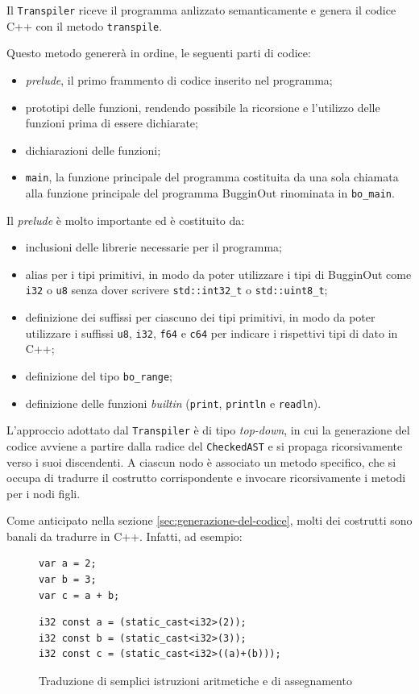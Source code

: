 Il \texttt{Transpiler} riceve il programma anlizzato semanticamente e genera il codice C++ con il metodo \texttt{transpile}.

Questo metodo generer\`a in ordine, le seguenti parti di codice:
\begin{itemize}
	\item \emph{prelude}, il primo frammento di codice inserito nel programma;
	\item prototipi delle funzioni, rendendo possibile la ricorsione e l'utilizzo delle funzioni prima di essere dichiarate;
	\item dichiarazioni delle funzioni;
	\item \texttt{main}, la funzione principale del programma costituita da una sola chiamata alla funzione principale del programma BugginOut rinominata in \texttt{bo\_main}.
\end{itemize}

Il \textit{prelude} \`e molto importante ed \`e costituito da:
\begin{itemize}
	\item inclusioni delle librerie necessarie per il programma;
	\item alias per i tipi primitivi, in modo da poter utilizzare i tipi di BugginOut come \texttt{i32} o \texttt{u8} senza dover scrivere \texttt{std::int32\_t} o \texttt{std::uint8\_t};
	\item definizione dei suffissi per ciascuno dei tipi primitivi, in modo da poter utilizzare i suffissi \texttt{u8}, \texttt{i32}, \texttt{f64} e \texttt{c64} per indicare i rispettivi tipi di dato in C++;
	\item definizione del tipo \texttt{bo\_range};
	\item definizione delle funzioni \textit{builtin} (\texttt{print}, \texttt{println} e \texttt{readln}).
\end{itemize}

L'approccio adottato dal \texttt{Transpiler} è di tipo \textit{top-down}, in cui la generazione del codice avviene a partire dalla radice del \texttt{CheckedAST} e si propaga ricorsivamente verso i suoi discendenti. A ciascun nodo è associato un metodo specifico, che si occupa di tradurre il costrutto corrispondente e invocare ricorsivamente i metodi per i nodi figli.

Come anticipato nella sezione \ref{sec:generazione-del-codice}, molti dei costrutti sono banali da tradurre in C++. Infatti, ad esempio:

\begin{figure}[H]
	\centering
	\begin{verbatim}
var a = 2;
var b = 3;
var c = a + b;
	\end{verbatim}
	\begin{verbatim}
i32 const a = (static_cast<i32>(2));
i32 const b = (static_cast<i32>(3));
i32 const c = (static_cast<i32>((a)+(b)));
	\end{verbatim}
	\caption{Traduzione di semplici istruzioni aritmetiche e di assegnamento}
	\label{fig:transpiler-trivial-code}
\end{figure}

